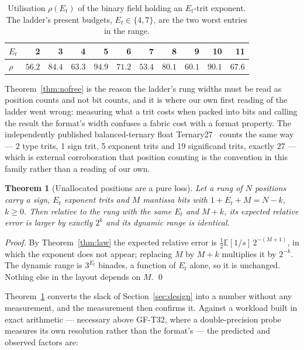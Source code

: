 \documentclass[11pt]{article}
\newtheorem{theorem}{Theorem}
\theoremstyle{definition}
\begin{document}
\begin{table}[t]\centering
\caption{Utilisation $\rho(E_t)$ of the binary field holding an $E_t$-trit
exponent. The ladder's present budgets, $E_t \in \{4, 7\}$, are the two worst
entries in the range.}
\label{tab:rho}
\begin{tabular}{lrrrrrrrrrr}
\toprule
$E_t$ & 2 & 3 & 4 & 5 & 6 & 7 & 8 & 9 & 10 & 11 \\
\midrule
$\rho$ & $56.2$ & $84.4$ & $\mathbf{63.3}$ & $94.9$ & $71.2$ & $\mathbf{53.4}$ & $80.1$ & $60.1$ & $90.1$ & $67.6$ \\
\bottomrule
\end{tabular}
\end{table}

Theorem~\ref{thm:nofree} is the reason the ladder's rung widths must be read as
position counts and not bit counts, and it is where our own first reading of the
ladder went wrong: measuring what a trit costs when packed into bits and calling
the result the format's width confuses a fabric cost with a format property. The
independently published balanced-ternary float Ternary27~\cite{ternary27} counts
the same way --- 2 type trits, 1 sign trit, 5 exponent trits and 19 significand
trits, exactly 27 --- which is external corroboration that position counting is
the convention in this family rather than a reading of our own.

\begin{theorem}[Unallocated positions are a pure loss]
\label{thm:alloc}
Let a rung of $N$ positions carry a sign, $E_t$ exponent trits and $M$ mantissa
bits with $1 + E_t + M = N - k$, $k \geq 0$. Then relative to the rung with the
same $E_t$ and $M + k$, its expected relative error is larger by exactly $2^{k}$
and its dynamic range is identical.
\end{theorem}

\begin{proof}
By Theorem~\ref{thm:law} the expected relative error is
$\tfrac12 \mathbb{E}[1/s]\,2^{-(M+1)}$, in which the exponent does not appear;
replacing $M$ by $M+k$ multiplies it by $2^{-k}$. The dynamic range is
$3^{E_t}$ binades, a function of $E_t$ alone, so it is unchanged. Nothing else in
the layout depends on $M$. \qed
\end{proof}

Theorem~\ref{thm:alloc} converts the slack of Section~\ref{sec:design} into a
number without any measurement, and the measurement then confirms it. Against a
workload built in exact arithmetic --- necessary above GF-T32, where a
double-precision probe measures its own resolution rather than the format's ---
the predicted and observed factors are:
\end{document}
